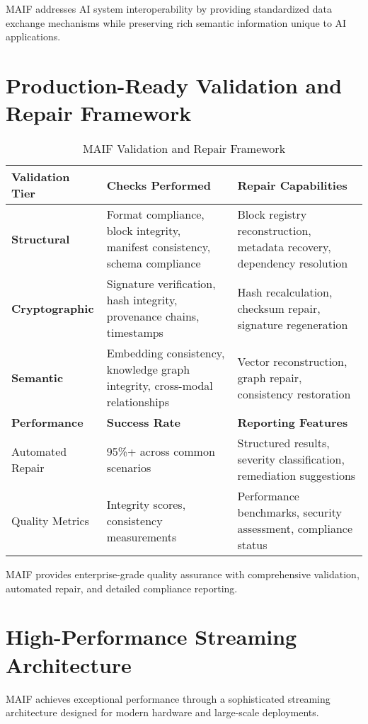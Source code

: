 \documentclass[conference]{IEEEtran}
\begin{document}
MAIF addresses AI system interoperability by providing standardized data exchange mechanisms while preserving rich semantic information unique to AI applications.

\section{Production-Ready Validation and Repair Framework}

\begin{table*}[!t]
\renewcommand{\arraystretch}{1.3}
\caption{MAIF Validation and Repair Framework}
\label{tab:validation-framework}
\centering
\footnotesize
\begin{tabular}{p{3cm}p{5cm}p{5cm}}
\toprule
\textbf{Validation Tier} & \textbf{Checks Performed} & \textbf{Repair Capabilities} \\
\midrule
\textbf{Structural} & Format compliance, block integrity, manifest consistency, schema compliance & Block registry reconstruction, metadata recovery, dependency resolution \\
\textbf{Cryptographic} & Signature verification, hash integrity, provenance chains, timestamps & Hash recalculation, checksum repair, signature regeneration \\
\textbf{Semantic} & Embedding consistency, knowledge graph integrity, cross-modal relationships & Vector reconstruction, graph repair, consistency restoration \\
\midrule
\textbf{Performance} & \textbf{Success Rate} & \textbf{Reporting Features} \\
\midrule
Automated Repair & 95\%+ across common scenarios & Structured results, severity classification, remediation suggestions \\
Quality Metrics & Integrity scores, consistency measurements & Performance benchmarks, security assessment, compliance status \\
\bottomrule
\end{tabular}
\end{table*}

MAIF provides enterprise-grade quality assurance with comprehensive validation, automated repair, and detailed compliance reporting.

\section{High-Performance Streaming Architecture}

MAIF achieves exceptional performance through a sophisticated streaming architecture designed for modern hardware and large-scale deployments.
\end{document}
